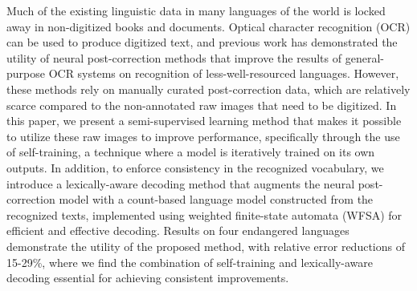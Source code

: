 Much of the existing linguistic data in many languages of the world is locked away in non-digitized books and documents. Optical character recognition (OCR) can be used to produce digitized text, and previous work has demonstrated the utility of neural post-correction methods that improve the results of general-purpose OCR systems on recognition of less-well-resourced languages. However, these methods rely on manually curated post-correction data, which are relatively scarce compared to the non-annotated raw images that need to be digitized. In this paper, we present a semi-supervised learning method that makes it possible to utilize these raw images to improve performance, specifically through the use of self-training, a technique where a model is iteratively trained on its own outputs. In addition, to enforce consistency in the recognized vocabulary, we introduce a lexically-aware decoding method that augments the neural post-correction model with a count-based language model constructed from the recognized texts, implemented using weighted finite-state automata (WFSA) for efficient and effective decoding. Results on four endangered languages demonstrate the utility of the proposed method, with relative error reductions of 15-29\%, where we find the combination of self-training and lexically-aware decoding essential for achieving consistent improvements.